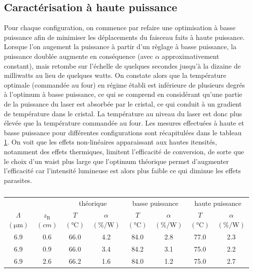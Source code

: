 \documentclass[11pt,a4paper] { article}
\newcommand{\ra}[1]{\renewcommand{\arraystretch}{#1}}
\newcommand{\zr}{z_\mathsc{R}}
\newcommand{\mathsc}[1]{\mathrm{\scriptscriptstyle {#1}}}
\begin{document}
\subsection{Caractérisation à haute puissance}
Pour chaque configuration, on commence par refaire une optimisation à basse puissance afin de minimiser les déplacements du faisceau faits à haute puissance.
Lorsque l'on augement la puissance à partir d'un règlage à basse puissance, la puissance doublée augmente en conséquence (avec $\alpha$ approximativement constant), mais retombe sur l'échelle de quelques secondes jusqu'à la dizaine de milliwatts au lieu de quelques watts. On constate alors que la température optimale (commandée au four) en régime établi est inférieure de plusieurs degrés à l'optimum à basse puissance, ce qui se comprend en considérant qu'une partie de la puissance du laser est absorbée par le cristal, ce qui conduit à un gradient de température dans le cristal. La température au niveau du laser est donc plus élevée que la température commandée au four. Les mesures effectuées à haute et basse puissance pour différentes configurations sont récapitulées dans le tableau \ref{table:mes}. On voit que les effets non-linéaires apparaissant aux hautes itensités, notamment des effets thermiques, limitent l'efficacité de conversion, de sorte que le choix d'un waist plus large que l'optimum théorique permet d'augmenter l'efficacité car l'intensité lumineuse est alors plus faible ce qui diminue les effets parasites.

\begin{table}[htpb]
\centering
\ra{1.3}
\begin{tabular}{@{}cccccccc@{}} \toprule
 &  & \multicolumn{2}{c}{théorique} & \multicolumn{2}{c}{basse puissance} & \multicolumn{2}{c}{haute puissance} \\ 
 \cmidrule(r){3-4} \cmidrule(lr){5-6} \cmidrule(l){7-8} 
 $\Lambda$ $(\unit{\micro\meter})$ & $\zr$ $(\unit{cm})$ & $T$ $(\unit{\celsius})$ & $\alpha$ $(\unit{\percent\per\watt})$& $T$ $(\unit{\celsius})$ & $\alpha$ $(\unit{\percent\per\watt})$ & $T$ $(\unit{\celsius})$ & $\alpha$ $(\unit{\percent\per\watt})$   \\ \midrule
 6.9       & 0.6  & 66.0  & 4.2      & 84.0 & 2.8      & 77.0 & 2.3      \\
 6.9       & 0.9  & 66.0  & 3.4      & 84.2 & 3.1      & 75.0 & 2.2      \\
 6.9       & 2.6  & 66.2  & 1.6      & 84.0 & 1.2      & 75.0   & 2.7      \\ \bottomrule 
\end{tabular}
\caption{}
\label{table:mes}
\end{table}
\end{document}
